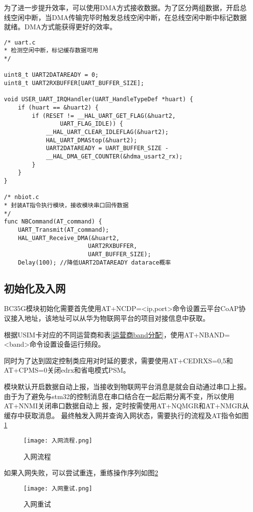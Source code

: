 为了进一步提升效率，可以使用DMA方式接收数据。为了区分两组数据，开启总线空闲中断，当DMA传输完毕时触发总线空闲中断，在总线空闲中断中标记数据就绪。DMA方式能获得更好的效率。

\begin{lstlisting}
/* uart.c
* 检测空闲中断，标记缓存数据可用
*/

uint8_t UART2DATAREADY = 0;
uint8_t UART2RXBUFFER[UART_BUFFER_SIZE];

void USER_UART_IRQHandler(UART_HandleTypeDef *huart) {
    if (huart == &huart2) {
        if (RESET != __HAL_UART_GET_FLAG(&huart2, 
                UART_FLAG_IDLE)) {
            __HAL_UART_CLEAR_IDLEFLAG(&huart2);
            HAL_UART_DMAStop(&huart2);
            UART2DATAREADY = UART_BUFFER_SIZE - 
            __HAL_DMA_GET_COUNTER(&hdma_usart2_rx);
        }
    }
}

/* nbiot.c
* 封装AT指令执行模块，接收模块串口回传数据
*/
func NBCommand(AT_command) {
    UART_Transmit(AT_command);
    HAL_UART_Receive_DMA(&huart2, 
                        UART2RXBUFFER, 
                        UART_BUFFER_SIZE);
    Delay(100); //降低UART2DATAREADY datarace概率
\end{lstlisting}    

\subsection{初始化及入网}
BC35G模块初始化需要首先使用AT+NCDP=<ip,port>命令设置云平台CoAP协议接入地址，该地址可以从华为物联网平台的项目对接信息中获取。

根据USIM卡对应的不同运营商和表\ref{运营商band分配}，使用AT+NBAND=<band>命令设置设备运行频段。

同时为了达到固定控制类应用对时延的要求，需要使用AT+CEDRXS=0,5和AT+CPMS=0关闭edrx和省电模式PSM。

模块默认开启数据自动上报，当接收到物联网平台消息是就会自动通过串口上报。由于为了避免与stm32的控制消息在串口结合在一起后期分离不变，所以使用AT+NNMI关闭串口数据自动上
报，定时按需使用AT+NQMGR和AT+NMGR从缓存中获取消息。
最终触发入网并查询入网状态，需要执行的流程及AT指令如图\ref{入网流程}

\begin{figure}[H]
    \centering
	\texttt{[image: 入网流程.png]}
	\caption{入网流程}
	\label{入网流程}
\end{figure}


如果入网失败，可以尝试重连，重练操作序列如图\ref{入网重试}

\begin{figure}[H]
    \centering
	\texttt{[image: 入网重试.png]}
	\caption{入网重试}
	\label{入网重试}
\end{figure}

